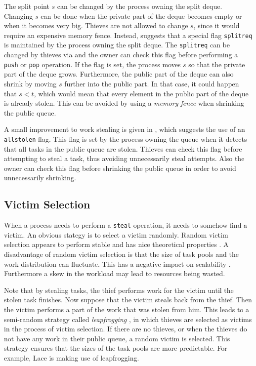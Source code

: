 The split point $s$ can be changed by the process owning the split deque. Changing $s$ can be done when the private part of the deque becomes empty or when it becomes very big. Thieves are not allowed to change $s$, since it would require an expensive memory fence. Instead, \cite{lace} suggests that a special flag \texttt{splitreq} is maintained by the process owning the split deque. The \texttt{splitreq} can be changed by thieves via  and the owner can check this flag before performing a \texttt{push} or \texttt{pop} operation. If the flag is set, the process moves $s$ so that the private part of the deque grows. Furthermore, the public part of the deque can also shrink by moving $s$ further into the public part. In that case, it could happen that $s < t$, which would mean that every element in the public part of the deque is already stolen. This can be avoided by using a \emph{memory fence} when shrinking the public queue.

A small improvement to work stealing is given in \cite{lace}, which suggests the use of an \texttt{allstolen} flag. This flag is set by the process owning the queue when it detects that all tasks in the public queue are stolen. Thieves can check this flag before attempting to steal a task, thus avoiding unnecessarily steal attempts. Also the owner can check this flag before shrinking the public queue in order to avoid unnecessarily shrinking.

\subsection{Victim Selection}
When a process needs to perform a \texttt{steal} operation, it needs to somehow find a victim. An obvious stategy is to select a victim randomly. Random victim selection appears to perform stable and has nice theoretical properties \cite{Blumofe:1998:PWS:277858.277939}. A disadvantage of random victim selection is that the size of task pools and the work distribution can fluctuate. This has a negative impact on scalability \cite{dinan2009scalable}. Furthermore a skew in the workload may lead to resources being wasted. 

Note that by stealing tasks, the thief performs work for the victim until the stolen task finishes. Now suppose that the victim steals back from the thief. Then the victim performs a part of the work that was stolen from him. This leads to a semi-random strategy called \emph{leapfrogging} \cite{Wagner:1993:LPT:173284.155354}, in which thieves are selected as victims in the process of victim selection. If there are no thieves, or when the thieves do not have any work in their public queue, a random victim is selected. This strategy ensures that the sizes of the task pools are more predictable. For example, Lace is making use of leapfrogging.

